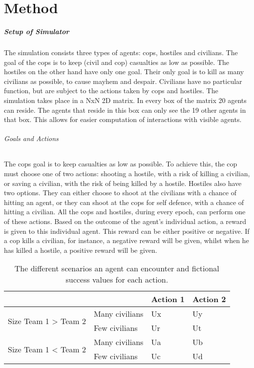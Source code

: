 \chapter{Method}
\paragraph{Setup of Simulator}
The simulation consists three types of agents: cops, hostiles and civilians. The goal of the cops is to keep (civil and cop) casualties as low as possible. The hostiles on the other hand have only one goal. Their only goal is to kill as many civilians as possible, to cause mayhem and despair. Civilians have no particular function, but are subject to the actions taken by cops and hostiles. The simulation takes place in a NxN 2D matrix. In every box of the matrix 20 agents can reside. The agents that reside in this box can only see the 19 other agents in that box. This allows for easier computation of interactions with visible agents. 

\subparagraph{Goals and Actions}
The cops goal is to keep casualties as low as possible. To achieve this, the cop must choose one of two actions: shooting a hostile, with a risk of killing a civilian, or saving a civilian, with the risk of being killed by a hostile. Hostiles also have two options. They can either choose to shoot at the civilians with a chance of hitting an agent, or they can shoot at the cops for self defence, with a chance of hitting a civilian. All the cops and hostiles, during every epoch, can perform one of these actions. Based on the outcome of the agent's individual action, a reward is given to this individual agent. This reward can be either positive or negative. If a cop kills a civilian, for instance, a negative reward will be given, whilst when he has killed a hostile, a positive reward will be given. 

\begin{table}[!ht]
\begin{center}
\begin{tabular}{l l | l l}
\hline
 & & Action 1 & Action 2 \\
\hline
\multirow{2}{*}{Size Team 1 > Team 2} & Many civilians & Ux & Uy \\
 & Few civilians & Ur & Ut \\
\hline
\multirow{2}{*}{Size Team 1 < Team 2} & Many civilians & Ua & Ub\\
 & Few civilians & Uc & Ud\\
\hline
\end{tabular}
\caption{The different scenarios an agent can encounter and fictional success values for each action.}
\label{tab:scenarios}
\end{center}
\end{table}


